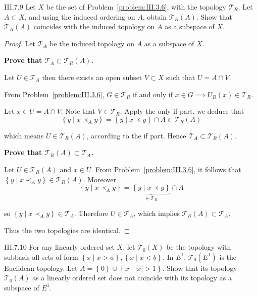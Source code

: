 \begin{problem}{III.7.9}
Let \(X\) be the set of Problem~\ref{problem:III.3.6}, with the topology \( \mathscr{T}_{R} \). Let \( A \subset X \), and using the induced ordering on \(A\), obtain \( \mathscr{T}_{R}(A) \). Show that \( \mathscr{T}_{R}(A) \) coincides with the induced topology on \(A\) as a subspace of \(X\).
\end{problem}

\begin{proof}
    Let \( \mathscr{T}_{A} \) be the induced topology on \(A\) as a subspace of \(X\).

    \textbf{Prove that \( \mathscr{T}_{A} \subset \mathscr{T}_{R}(A) \).}

    Let \( U \in \mathscr{T}_{A} \) then there exists an open subset \( V \subset X \) such that \( U = A \cap V \).

    From Problem~\ref{problem:III.3.6}, \( G \in \mathscr{T}_{R} \) if and only if \( x \in G \implies U_{R}(x) \in \mathscr{T}_{R} \).

    Let \( x \in U = A \cap V \). Note that \( V \in \mathscr{T}_{R} \). Apply the only if part, we deduce that
    \[
        \left\{ y \mid x \prec_{A} y \right\} = \left\{ y \mid x \prec y \right\} \cap A \in \mathscr{T}_{R}(A)
    \]

    which means \( U \in \mathscr{T}_{R}(A) \), according to the if part. Hence \( \mathscr{T}_{A} \subset \mathscr{T}_{R}(A) \).

    \textbf{Prove that \( \mathscr{T}_{R}(A) \subset \mathscr{T}_{A} \).}

    Let \( U \in \mathscr{T}_{R}(A) \) and \( x \in U \). From Problem~\ref{problem:III.3.6}, it follows that \( \left\{ y \mid x \prec_{A} y \right\} \in \mathscr{T}_{R}(A) \). Moreover
    \[
        \left\{ y \mid x \prec_{A} y \right\} = \underbrace{\left\{ y \mid x \prec y \right\}}_{\in \mathscr{T}_{R}} \cap A
    \]

    so \( \left\{ y \mid x \prec_{A} y \right\} \in \mathscr{T}_{A} \). Therefore \( U \in \mathscr{T}_{A} \), which implies \( \mathscr{T}_{R}(A) \subset \mathscr{T}_{A} \).

    Thus the two topologies are identical.
\end{proof}

\begin{problem}{III.7.10}
For any linearly ordered set \(X\), let \( \mathscr{T}_{0}(X) \) be the topology with subbasis all sets of form \( \left\{ x \mid x > a \right\}, \left\{ x \mid x < b \right\} \). In \( E^{1} \), \( \mathscr{T}_{0}(E^{1}) \) is the Euclidean topology. Let \( A = \left\{0\right\} \cup \left\{ x \mid \left\vert{x}\right\vert > 1 \right\} \). Show that its topology \( \mathscr{T}_{0}(A) \) as a linearly ordered set does not coincide with its topology as a subspace of \(E^{1}\).
\end{problem}

